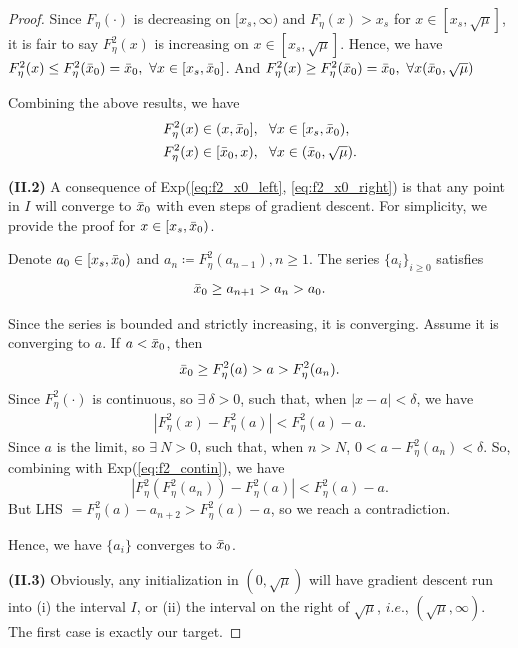 \documentclass{article}
\theoremstyle{plain}
\theoremstyle{remark}
\begin{document}
\begin{proof}

Since $F_\eta(\cdot)$ is decreasing on $[x_s,\infty)$ and $F_\eta(x)>x_s$ for $x\in[x_s,\sqrt{\mu}]$, it is fair to say $F^2_\eta(x)$ is increasing on $x\in[x_s,\sqrt{\mu}]$. Hence, we have $F^2_\eta(x)\le F^2_\eta(\Bar{x}_0)=\Bar{x}_0,~\forall x \in[x_s,\Bar{x}_0]$. And $F^2_\eta(x)\ge F^2_\eta(\Bar{x}_0)=\Bar{x}_0,~\forall x (\Bar{x}_0,\sqrt{\mu})$

Combining the above results, we have
\begin{align}
     F^2_\eta(x)&\in(x,\Bar{x}_0], ~~\forall x \in[x_s,\Bar{x}_0),
     \label{eq:f2_x0_left}
     \\
     F^2_\eta(x)&\in[\Bar{x}_0,x), ~~\forall x \in(\Bar{x}_0,\sqrt{\mu}).
     \label{eq:f2_x0_right}
\end{align}

\textbf{(II.2)} A consequence of Exp(\ref{eq:f2_x0_left}, \ref{eq:f2_x0_right}) is that any point in $I$ will converge to $\Bar{x}_0$ with even steps of gradient descent. For simplicity, we provide the proof for $x\in[x_s,\Bar{x}_0)$.

Denote $a_0\in[x_s,\Bar{x}_0)$ and $a_n\coloneqq F^2_\eta(a_{n-1}), n\ge 1$. The series $\{a_i\}_{i\ge0}$ satisfies
\begin{align}
    \Bar{x}_0\ge a_{n+1} >a_n>a_0.
\end{align}

Since the series is bounded and strictly increasing, it is converging. Assume it is converging to $a$. If $a<\Bar{x}_0$, then
\[
\Bar{x}_0\ge F^2_\eta(a)>a>F^2_\eta(a_n).
\]
Since $F^2_\eta(\cdot)$ is continuous, so $\exists~ \delta>0$, such that, when $|x-a|<\delta$, we have
\begin{align}
    |F^2_\eta(x)-F^2_\eta(a)|<F^2_\eta(a)-a.
    \label{eq:f2_contin}
\end{align}
Since $a$ is the limit, so $\exists~ N>0$, such that, when $n>N$, $0<a-F^2_\eta(a_n)<\delta$. So, combining with Exp(\ref{eq:f2_contin}), we have
\[
|F^2_\eta(F^2_\eta(a_n))-F^2_\eta(a)|<F^2_\eta(a)-a.
\]
But LHS $=F^2_\eta(a)-a_{n+2}>F^2_\eta(a)-a$, so we reach a contradiction.

Hence, we have $\{a_i\}$ converges to $\Bar{x}_0$.

\textbf{(II.3)} Obviously, any initialization in $(0,\sqrt{\mu})$ will have gradient descent run into (i) the interval $I$, or (ii) the interval on the right of $\sqrt{\mu}$, $\textit{i.e.}$, $(\sqrt{\mu},\infty)$. The first case is exactly our target.


\end{proof}
\end{document}
